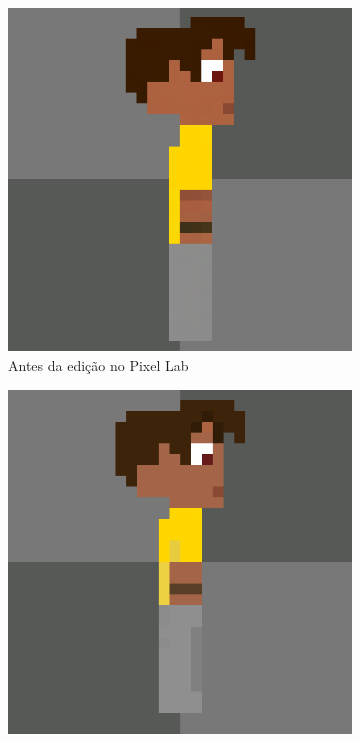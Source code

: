 \begin{figure}[htbp]
    \centering
    \caption{\small Processo de edição no Pixel Lab do sprite em side view gerado pelo Gemini Pro}
    \label{fig:pixelLabFinalSideView}
    \begin{subfigure}{0.32\linewidth}
        \centering
        \includegraphics[width=1\linewidth]{figs/pixelLab/dia3/semFix.PNG}
        \caption{\small Antes da edição no Pixel Lab}
        \label{fig:pixelLabFinalSideView1}
    \end{subfigure}
    \begin{subfigure}{0.32\linewidth}
        \centering
        \includegraphics[width=1\linewidth]{figs/pixelLab/dia3/fixGrande.PNG}

\end{subfigure}
\end{figure}
